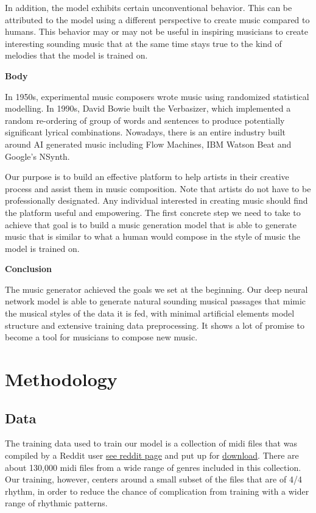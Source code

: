 \documentclass[12pt,oneside]{chicagocapstone}
\begin{document}
In addition, the model exhibits certain unconventional behavior. This can be attributed to the model using a different perspective to create music compared to humans. This behavior may or may not be useful in inspiring musicians to create interesting sounding music that at the same time stays true to the kind of melodies that the model is trained on.

\textbf{Body}

In 1950s, experimental music composers wrote music using randomized statistical modelling. In 1990s, David Bowie built the Verbasizer, which implemented a random re-ordering of group of words and sentences to produce potentially significant lyrical combinations. Nowadays, there is an entire industry built around AI generated music including Flow Machines, IBM Watson Beat and Google's NSynth.

Our purpose is to build an effective platform to help artists in their creative process and assist them in music composition. Note that artists do not have to be professionally designated. Any individual interested in creating music should find the platform useful and empowering. The first concrete step we need to take to achieve that goal is to build a music generation model that is able to generate music that is similar to what a human would compose in the style of music the model is trained on.

\textbf{Conclusion}

The music generator achieved the goals we set at the beginning. Our deep neural network model is able to generate natural sounding musical passages that mimic the musical styles of the data it is fed, with minimal artificial elements model structure and extensive training data preprocessing. It shows a lot of promise to become a tool for musicians to compose new music.

\newpage

\hypertarget{methodology}{%
\chapter*{Methodology}\label{methodology}}

\hypertarget{methodology-data}{%
\section*{Data}\label{methodology-data}}

The training data used to train our model is a collection of midi files that was compiled by a Reddit user \href{https://www.reddit.com/r/WeAreTheMusicMakers/comments/3ajwe4/the_largest_midi_collection_on_the_internet/}{see reddit page} and put up for \href{https://mega.co.nz/\#!Elg1TA7T!MXEZPzq9s9YObiUcMCoNQJmCbawZqzAkHzY4Ym6Gs_Q}{download}. There are about 130,000 midi files from a wide range of genres included in this collection. Our training, however, centers around a small subset of the files that are of 4/4 rhythm, in order to reduce the chance of complication from training with a wider range of rhythmic patterns.
\end{document}
